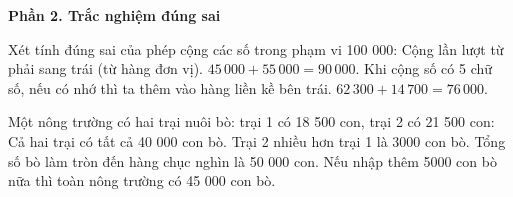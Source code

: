 \textbf{Phần 2. Trắc nghiệm đúng sai}

\begin{ex} %
Xét tính đúng sai của phép cộng các số trong phạm vi 100 000:
\choiceTF
{\True Cộng lần lượt từ phải sang trái (từ hàng đơn vị).}
{$45\,000 + 55\,000 = 90\,000$.}
{\True Khi cộng số có 5 chữ số, nếu có nhớ thì ta thêm vào hàng liền kề bên trái.}
{$62\,300 + 14\,700 = 76\,000$.}
\end{ex}

\begin{ex} %
Một nông trường có hai trại nuôi bò: trại 1 có 18 500 con, trại 2 có 21 500 con:
\choiceTF
{\True Cả hai trại có tất cả 40 000 con bò.}
{\True Trại 2 nhiều hơn trại 1 là 3000 con bò.}
{Tổng số bò làm tròn đến hàng chục nghìn là 50 000 con.}
{\True Nếu nhập thêm 5000 con bò nữa thì toàn nông trường có 45 000 con bò.}
\end{ex}

